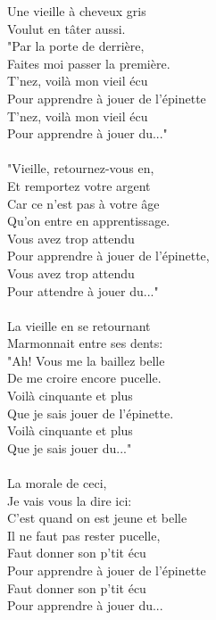 \breakpage
Une vieille à cheveux gris ~~ \bissimplemple
\\Voulut en tâter aussi. ~~~~~~~ \bissimplemple
\\"Par la porte de derrière,
\\Faites moi passer la première.
\\T'nez, voilà mon vieil écu
\\Pour apprendre à jouer de l'épinette
\\T'nez, voilà mon vieil écu
\\Pour apprendre à jouer du..."
\\\\"Vieille, retournez-vous en, ~~ \bissimplemple
\\Et remportez votre argent ~~~ \bissimplemple
\\Car ce n'est pas à votre âge
\\Qu'on entre en apprentissage.
\\Vous avez trop attendu
\\Pour apprendre à jouer de l'épinette,
\\Vous avez trop attendu
\\Pour attendre à jouer du..."
\\\\La vieille en se retournant ~~~~~~ \bissimplemple
\\Marmonnait entre ses dents: ~~ \bissimplemple
\\"Ah! Vous me la baillez belle
\\De me croire encore pucelle.
\\Voilà cinquante et plus
\\Que je sais jouer de l'épinette.
\\Voilà cinquante et plus
\\Que je sais jouer du..."
\\\\La morale de ceci, ~~~~~~~~~ \bissimplemple
\\Je vais vous la dire ici: ~~ \bissimplemple
\\C'est quand on est jeune et belle
\\Il ne faut pas rester pucelle,
\\Faut donner son p'tit écu
\\Pour apprendre à jouer de l'épinette
\\Faut donner son p'tit écu
\\Pour apprendre à jouer du...


\breakpage